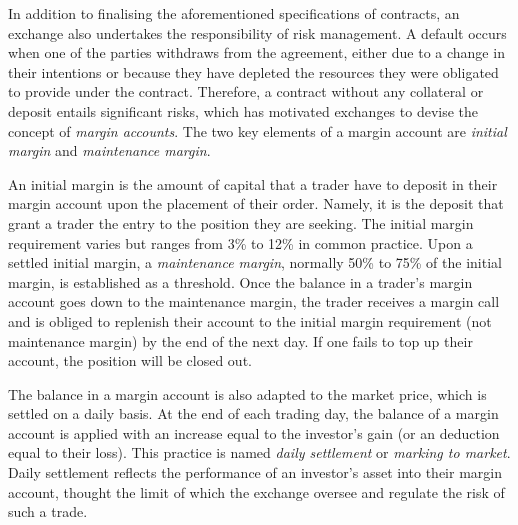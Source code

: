 \documentclass[11pt,twoside]{article}
\numberwithin{Theorem}{section}
\numberwithin{Definition}{section}
\numberwithin{Lemma}{section}
\numberwithin{Algorithm}{section}
\numberwithin{equation}{section}
\begin{document}
In addition to finalising the aforementioned specifications of contracts, an exchange also undertakes the responsibility of risk management. A default occurs when one of the parties withdraws from the agreement, either due to a change in their intentions or because they have depleted the resources they were obligated to provide under the contract. Therefore, a contract without any collateral or deposit entails significant risks, which has motivated exchanges to devise the concept of \emph{margin accounts}. The two key elements of a margin account are \emph{initial margin} and \emph{maintenance margin}. 

An initial margin is the amount of capital that a trader have to deposit in their margin account upon the placement of their order. Namely, it is the deposit that grant a trader the entry to the position they are seeking. The initial margin requirement varies but ranges from 3\% to 12\% in common practice. Upon a settled initial margin, a \emph{maintenance margin}, normally 50\% to 75\% of the initial margin, is established as a threshold. Once the balance in a trader's margin account goes down to the maintenance margin, the trader receives a margin call and is obliged to replenish their account to the initial margin requirement (not maintenance margin) by the end of the next day. If one fails to top up their account, the position will be closed out. 

The balance in a margin account is also adapted to the market price, which is settled on a daily basis. At the end of each trading day, the balance of a margin account is applied with an increase equal to the investor's gain (or an deduction equal to their loss). This practice is named \emph{daily settlement} or \emph{marking to market}. Daily settlement reflects the performance of an investor's asset into their margin account, thought the limit of which the exchange oversee and regulate the risk of such a trade.
\end{document}
